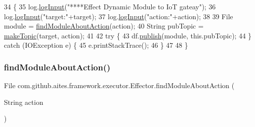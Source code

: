 \begin{DoxyCode}
34                                                               \{
35         log.\mbox{\hyperlink{classcom_1_1github_1_1aites_1_1framework_1_1log_1_1_log_writter_ad2c412c85ba5932c7fa4f920c50f44c9}{logInput}}(\textcolor{stringliteral}{"****Effect Dynamic Module to IoT gateay"});
36         log.\mbox{\hyperlink{classcom_1_1github_1_1aites_1_1framework_1_1log_1_1_log_writter_ad2c412c85ba5932c7fa4f920c50f44c9}{logInput}}(\textcolor{stringliteral}{"target:"}+target);
37         log.\mbox{\hyperlink{classcom_1_1github_1_1aites_1_1framework_1_1log_1_1_log_writter_ad2c412c85ba5932c7fa4f920c50f44c9}{logInput}}(\textcolor{stringliteral}{"action:"}+action);
38         
39         File module = \mbox{\hyperlink{classcom_1_1github_1_1aites_1_1framework_1_1executor_1_1_effector_a96119f173f888fdde3f37a3557d6f6ce}{findModuleAboutAction}}(action);
40         String pubTopic = \mbox{\hyperlink{classcom_1_1github_1_1aites_1_1framework_1_1executor_1_1_effector_aa41e495f98690fcbed0bd8aded38d52a}{makeTopic}}(target, action);
41         
42         \textcolor{keywordflow}{try} \{
43             df.\mbox{\hyperlink{classcom_1_1github_1_1aites_1_1framework_1_1communicate_1_1_data_transfer_a90bd50b85b1d619ef9bcf4720b3a1c27}{publish}}(module, this.pubTopic);
44         \} \textcolor{keywordflow}{catch} (IOException e) \{
45             e.printStackTrace();
46         \}
47         
48     \}
\end{DoxyCode}
\mbox{\label{classcom_1_1github_1_1aites_1_1framework_1_1executor_1_1_effector_a96119f173f888fdde3f37a3557d6f6ce}} 
\subsubsection{\texorpdfstring{find\+Module\+About\+Action()}{findModuleAboutAction()}}
{\footnotesize\ttfamily File com.\+github.\+aites.\+framework.\+executor.\+Effector.\+find\+Module\+About\+Action (\begin{DoxyParamCaption}\item[{String}]{action }\end{DoxyParamCaption})\hspace{0.3cm}{\ttfamily [private]}}



